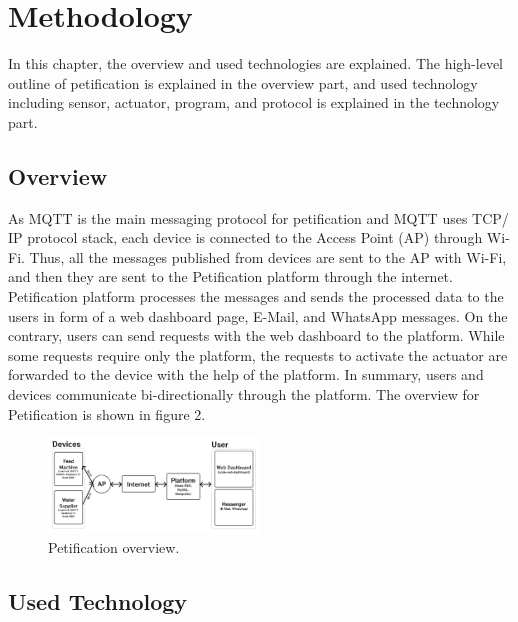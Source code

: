 \documentclass[conference]{IEEEtran}
\begin{document}
\section{Methodology}
In this chapter, the overview and used technologies are explained. The high-level outline of petification is explained in the overview part, and used technology including sensor, actuator, program, and protocol is explained in the technology part.

\subsection{Overview}
As MQTT is the main messaging protocol for petification and MQTT uses TCP/ IP protocol stack, each device is connected to the Access Point (AP) through Wi-Fi. Thus, all the messages published from devices are sent to the AP with Wi-Fi, and then they are sent to the Petification platform through the internet. Petification platform processes the messages and sends the processed data to the users in form of a web dashboard page, E-Mail, and WhatsApp messages. On the contrary, users can send requests with the web dashboard to the platform. While some requests require only the platform, the requests to activate the actuator are forwarded to the device with the help of the platform. In summary, users and devices communicate bi-directionally through the platform. The overview for Petification is shown in figure 2.

\begin{figure}[htbp]
\centerline{\includegraphics[width=0.5\textwidth]{./images/Overview.png}}
\caption{Petification overview.}
\label{fig}
\end{figure}

\subsection{Used Technology}
\end{document}
